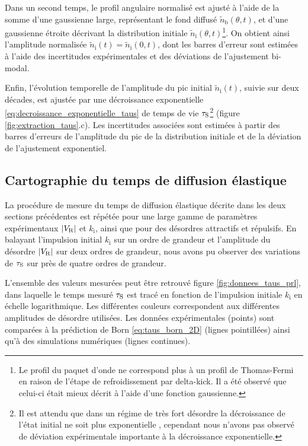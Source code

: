 Dans un second temps, le profil angulaire normalisé est ajusté à l'aide de la somme d'une gaussienne large, représentant le fond diffusé $\tilde{n}_{\mathrm{b}}(\theta,t)$, et d'une gaussienne étroite décrivant la distribution initiale $\tilde{n}_{\mathrm{i}}(\theta,t)$\footnote{Le profil du paquet d'onde ne correspond plus à un profil de Thomas-Fermi en raison de l'étape de refroidissement par delta-kick. Il a été observé que celui-ci était mieux décrit à l'aide d'une fonction gaussienne.}. On obtient ainsi l'amplitude normalisée $\tilde{n}_{\mathrm{i}}(t)=\tilde{n}_{\mathrm{i}}(0,t)$, dont les barres d'erreur sont estimées à l'aide des incertitudes expérimentales et des déviations de l'ajustement bi-modal. 

Enfin, l'évolution temporelle de l'amplitude du pic initial $\tilde{n}_{\mathrm{i}}(t)$, suivie sur deux décades, est ajustée par une décroissance exponentielle \ref{eq:decroissance_exponentielle_taus} de temps de vie $\tau_{\mathrm{S}}$\footnote{Il est attendu que dans un régime de très fort désordre la décroissance de l'état initial ne soit plus exponentielle \citep{trappe2015semiclassical}, cependant nous n'avons pas observé de déviation expérimentale importante à la décroissance exponentielle.} (figure \ref{fig:extraction_taus}.c). Les incertitudes associées sont estimées à partir des barres d'erreurs de l'amplitude du pic de la distribution initiale et de la déviation de l'ajustement exponentiel. 




\subsection{Cartographie du temps de diffusion élastique}

La procédure de mesure du temps de diffusion élastique décrite dans les deux sections précédentes est répétée pour une large gamme de paramètres expérimentaux $|V_{\mathrm{R}}|$ et $k_{\mathrm{i}}$, ainsi que pour des désordres attractifs et répulsifs. En balayant l'impulsion initial $k_{\mathrm{i}}$ sur un ordre de grandeur et l'amplitude du désordre $|V_{\mathrm{R}}|$ sur deux ordres de grandeur, nous avons pu observer des variations de $\tau_{\mathrm{S}}$ sur près de quatre ordres de grandeur. 

L'ensemble des valeurs mesurées peut être retrouvé figure \ref{fig:donnees_taus_prl}, dans laquelle le temps mesuré $\tau_{\mathrm{S}}$ est tracé en fonction de l'impulsion initiale $k_{\mathrm{i}}$ en échelle logarithmique. Les différentes couleurs correspondent aux différentes amplitudes de désordre utilisées. Les données expérimentales (points) sont comparées à la prédiction de Born \ref{eq:taus_born_2D} (lignes pointillées) ainsi qu'à des simulations numériques (lignes continues). 

